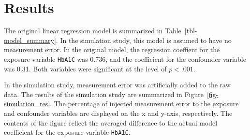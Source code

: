 \documentclass[
  letterpaper,
  DIV=11,
  numbers=noendperiod]{scrartcl}
\begin{document}
\section{Results}\label{results}

\begin{table}

\caption{\label{tbl-model_summary}Summary of the original model}


\end{table}%

The original linear regression model is summarized in
Table~\ref{tbl-model_summary}. In the simulation study, this model is
assumed to have no measurement error. In the original model, the
regression coeffient for the exposure variable \texttt{HbA1C} was 0.736,
and the coefficient for the confounder variable was 0.31. Both variables
were significant at the level of \(p < .001\).

In the simulation study, measurement error was artificially added to the
raw data. The results of the simulation study are summarized in
Figure~\ref{fig-simulation_res}. The percentage of injected measurement
error to the exposure and confounder variables are displayed on the x
and y-axis, respectively. The contents of the figure reflect the
averaged difference to the actual model coefficient for the exposure
variable \texttt{HbA1C}.
\end{document}
